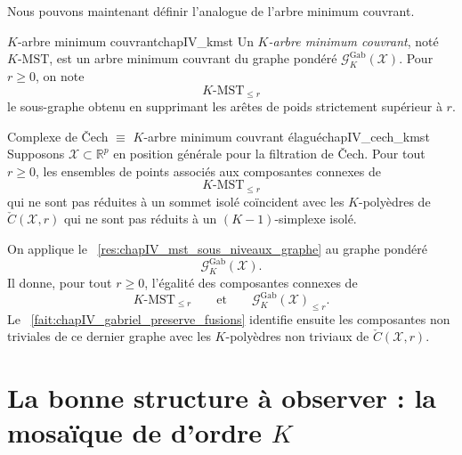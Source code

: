 Nous pouvons maintenant définir l'analogue de l'arbre minimum couvrant.

\begin{Definition}{$K$-arbre minimum couvrant}{chapIV_kmst}
Un \emph{$K$-arbre minimum couvrant}, noté $K\text{-}\mathrm{MST}$, est un arbre minimum couvrant du graphe pondéré $\mathcal G_K^{\mathrm{Gab}}(\mathcal X)$.
Pour $r\ge0$, on note
\[
\boxed{
    K\text{-}\mathrm{MST}_{\le r}
    }
\]
le sous-graphe obtenu en supprimant les arêtes de poids strictement supérieur à $r$.
\end{Definition}


\begin{Theoreme}{Complexe de \v Cech $\equiv$ $K$-arbre minimum couvrant élagué}{chapIV_cech_kmst}
Supposons $\mathcal X\subset\mathbb R^p$ en position générale pour la filtration de \v Cech. Pour tout $r\ge0$, les ensembles de points associés aux composantes connexes de
\[
    K\text{-}\mathrm{MST}_{\le r}
\]
qui ne sont pas réduites à un sommet isolé coïncident avec les $K$-polyèdres de $\check C(\mathcal X,r)$ qui ne sont pas réduits à un $(K-1)$-simplexe isolé.
\end{Theoreme}

\begin{Preuve}
On applique le \Res~\ref{res:chapIV_mst_sous_niveaux_graphe} au graphe pondéré
\[
    \mathcal G_K^{\mathrm{Gab}}(\mathcal X).
\]
Il donne, pour tout $r\ge0$, l'égalité des composantes connexes de
\[
    K\text{-}\mathrm{MST}_{\le r}
    \qquad\text{et}\qquad
    \mathcal G_K^{\mathrm{Gab}}(\mathcal X)_{\le r}.
\]
Le \Fact~\ref{fait:chapIV_gabriel_preserve_fusions} identifie ensuite les composantes non triviales de ce dernier graphe avec les $K$-polyèdres non triviaux de $\check C(\mathcal X,r)$.
\end{Preuve}


\section{La bonne structure à observer : la mosaïque de  d'ordre $K$}
\label{sec:chapIV_delaunay_ordre_k}

